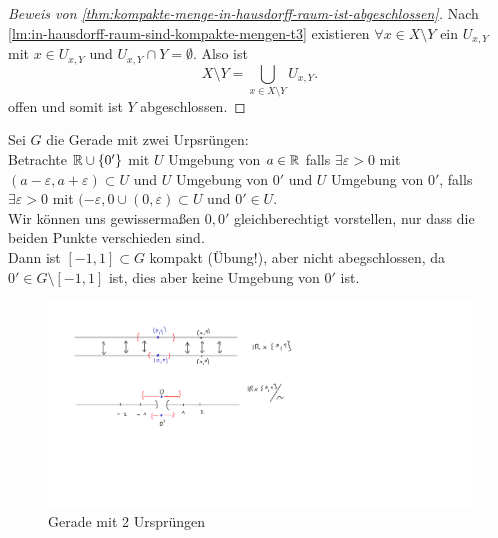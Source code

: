 \begin{proof}[Beweis von \autoref{thm:kompakte-menge-in-hausdorff-raum-ist-abgeschlossen}]
    Nach \autoref{lm:in-hausdorff-raum-sind-kompakte-mengen-t3} existieren $\forall x\in X \setminus Y$ ein $U_{x,Y}$ mit $x\in U_{x,Y}$ und $U_{x,Y} \cap Y = \emptyset$. Also ist
    \[
    X \setminus Y = \bigcup_{x\in X \setminus Y} U_{x,Y}
    .\] 
    offen und somit ist $Y$ abgeschlossen.
\end{proof}


\begin{example}
    Sei $G$ die Gerade mit zwei Urpsrüngen: \\
    Betrachte  $\mathbb{R}\cup \left \{0'\right\} $ mit $U$ Umgebung von  $a\in \mathbb{R}$ falls $\exists ε>0$ mit $(a-ε, a+ε)\subset U$ und $U$ Umgebung von  $0'$ und  $U$ Umgebung von  $0'$, falls  $\exists ε>0$ mit $(-ε,0 \cup (0,ε) \subset U$ und $0' \in U$. \\
    Wir können uns gewissermaßen  $0,0'$ gleichberechtigt vorstellen, nur dass die beiden Punkte verschieden sind. \\
    Dann ist  $[-1,1] \subset G$ kompakt (Übung!), aber nicht abegschlossen, da $0' \in G \setminus [-1,1]$ ist, dies aber keine Umgebung von $0'$ ist.
    \begin{figure}[H]
        \includegraphics[scale=0.4]{figures/line-with-2-origins.pdf}
    \caption{Gerade mit 2 Ursprüngen}
    \end{figure}
\end{example}

